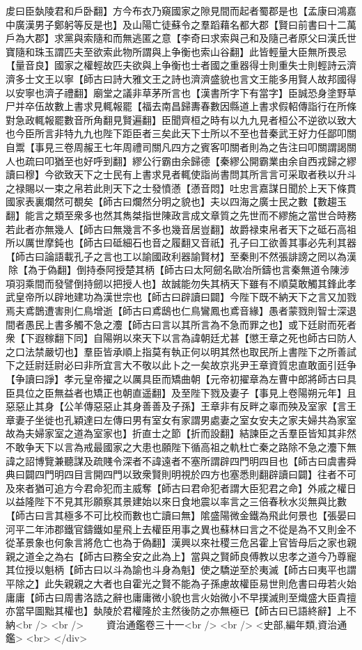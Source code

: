 䖍曰臣埶陵君和戶卧翻】方今布衣乃窺國家之隙見間而起者蜀郡是也【孟康曰鴻嘉中廣漢男子鄭躬等反是也】及山陽亡徒蘇令之羣蹈藉名都大郡【賢曰前書曰十二萬戶為大郡】求黨與索隨和而無逃匿之意【李奇曰求索與己和及隨己者原父曰漢氏世寶隨和珠玉謂匹夫至欲索此物所謂與上争衡也索山谷翻】此皆輕量大臣無所畏忌【量音良】國家之權輕故匹夫欲與上争衡也士者國之重器得士則重失士則輕詩云濟濟多士文王以寧【師古曰詩大雅文王之詩也濟濟盛貌也言文王能多用賢人故邦國得以安寧也濟子禮翻】廟堂之議非草茅所言也【漢書所字下有當字】臣誠恐身塗野草尸并卒伍故數上書求見輒報罷【福去南昌歸夀春數因縣道上書求假軺傳詣行在所條對急政輒報罷數音所角翻見賢遍翻】臣聞齊桓之時有以九九見者桓公不逆欲以致大也今臣所言非特九九也陛下距臣者三矣此天下士所以不至也昔秦武王好力任鄙叩關自鬻【事見三卷周赧王七年周禮司關凡四方之賓客叩關者則為之告注曰叩關謂謁關人也疏曰叩猶至也好呼到翻】繆公行霸由余歸德【秦繆公開霸業由余自西戎歸之繆讀曰穆】今欲致天下之士民有上書求見者輒使詣尚書問其所言言可采取者秩以升斗之禄賜以一束之帛若此則天下之士發憤懣【懣音悶】吐忠言嘉謀日聞於上天下條貫國家表裏爛然可覩矣【師古曰爛然分明之貌也】夫以四海之廣士民之數【數趨玉翻】能言之類至衆多也然其雋桀指世陳政言成文章質之先世而不繆施之當世合時務若此者亦無幾人【師古曰無幾言不多也幾音居豈翻】故爵禄束帛者天下之砥石高祖所以厲世摩鈍也【師古曰砥細石也音之履翻又音祇】孔子曰工欲善其事必先利其器【師古曰論語載孔子之言也工以諭國政利器諭賢材】至秦則不然張誹謗之罔以為漢除【為于偽翻】倒持泰阿授楚其柄【師古曰太阿劒名歐冶所鑄也言秦無道令陳涉項羽乘間而發譬倒持劒以把授人也】故誠能勿失其柄天下雖有不順莫敢觸其鋒此孝武皇帝所以辟地建功為漢世宗也【師古曰辟讀曰闢】今陛下既不納天下之言又加戮焉夫鳶鵲遭害則仁鳥增逝【師古曰鳶鴟也仁鳥鸞鳳也鳶音緣】愚者蒙戮則智士深退間者愚民上書多觸不急之灋【師古曰言以其所言為不急而罪之也】或下廷尉而死者衆【下遐稼翻下同】自陽朔以來天下以言為諱朝廷尤甚【懲王章之死也師古曰防人之口法禁嚴切也】羣臣皆承順上指莫有執正何以明其然也取民所上書陛下之所善試下之廷尉廷尉必曰非所宜言大不敬以此卜之一矣故京兆尹王章資質忠直敢面引廷争【争讀曰諍】孝元皇帝擢之以厲具臣而矯曲朝【元帝初擢章為左曹中郎將師古曰具臣具位之臣無益者也矯正也朝直遥翻】及至陛下戮及妻子【事見上卷陽朔元年】且惡惡止其身【公羊傳惡惡止其身善善及子孫】王章非有反畔之辜而殃及室家【言王章妻子坐徙也孔穎達曰左傳曰男有室女有家謂男處妻之室女安夫之家夫婦共為家室故為夫婦家室之道為室家也】折直士之節【折而設翻】結諫臣之舌羣臣皆知其非然不敢争天下以言為戒最國家之大患也願陛下循高祖之軌杜亡秦之路除不急之灋下無諱之詔博覽兼聽謀及疏賤令深者不諱遠者不塞所謂辟四門明四目也【師古曰虞書舜典曰闢四門明四目言開四門以致衆賢則明視於四方也塞悉則翻辟讀曰闢】往者不可及來者猶可追方今君命犯而主威奪【師古曰君命犯者謂大臣犯君之命】外戚之權日以益隆陛下不見其形願察其景建始以來日食地震以率言之三倍春秋水災無與比數【師古曰言其極多不可比校而數也亡讀曰無】隂盛陽微金鐵為飛此何景也【張晏曰河平二年沛郡鐵官鑄鐵如星飛上去權臣用事之異也蘇林曰言之不從是為不又則金不從革景象也何象言將危亡也為于偽翻】漢興以來社稷三危呂霍上官皆母后之家也親親之道全之為右【師古曰務全安之此為上】當與之賢師良傅教以忠孝之道今乃尊寵其位授以魁柄【師古曰以斗為諭也斗身為魁】使之驕逆至於夷滅【師古曰夷平也謂平除之】此失親親之大者也自霍光之賢不能為子孫慮故權臣易世則危書曰毋若火始庸庸【師古曰周書洛誥之辭也庸庸微小貌也言火始微小不早撲滅則至熾盛大臣貴擅亦當早圖黜其權也】埶陵於君權隆於主然後防之亦無極已【師古曰已語終辭】上不納<br />
<br />
　　資治通鑑卷三十一<br />
<br />
<史部,編年類,資治通鑑>  <br>
   </div> 

